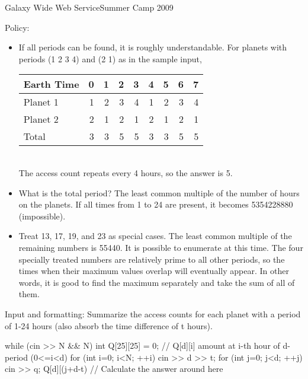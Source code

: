 \begin{versionbeta}
\begin{pbox}{Galaxy Wide Web Service}{Summer Camp 2009}
\end{pbox}

Policy:
\begin{itemize}
\setlength{\itemsep}{0pt}
\item If all periods can be found, it is roughly understandable.
For planets with periods (1 2 3 4) and (2 1) as in the sample input,
\begin{tabular}{l|rrrrrrrr}
Earth Time& 0 & 1 & 2 & 3 & 4 & 5 & 6 &7\\\hline
  Planet 1 & 1 & 2 & 3 & 4 & 1 & 2 & 3 & 4\\
  Planet 2 & 2 & 1 & 2 & 1 & 2 & 1 & 2 & 1\\\hline
  Total  & 3 & 3 & 5 & 5 & 3 & 3 & 5 & 5
\end{tabular}\\
The access count repeats every 4 hours, so the answer is 5.
\item What is the total period? The least common multiple of the number of hours on the planets. If all times from 1 to 24 are present, it becomes 5354228880 (impossible).
\item Treat 13, 17, 19, and 23 as special cases. The least common multiple of the remaining numbers is 55440. It is possible to enumerate at this time.
The four specially treated numbers are relatively prime to all other periods, so the times when their maximum values overlap will eventually appear. In other words, it is good to find the maximum separately and take the sum of all of them.
\end{itemize}

Input and formatting: Summarize the access counts for each planet with a period of 1-24 hours (also absorb the time difference of t hours).
\begin{cbox}
    while (cin >> N && N) {
        int Q[25][25] = {{0}}; // Q[d][i] amount at i-th hour of d-period (0<=i<d)
        for (int i=0; i<N; ++i) {
            cin >> d >> t;
            for (int j=0; j<d; ++j) {
                cin >> q;
                Q[d][(j+d-t)%
            }
        }
        // Calculate the answer around here
    }
\end{cbox}



\end{versionbeta}
